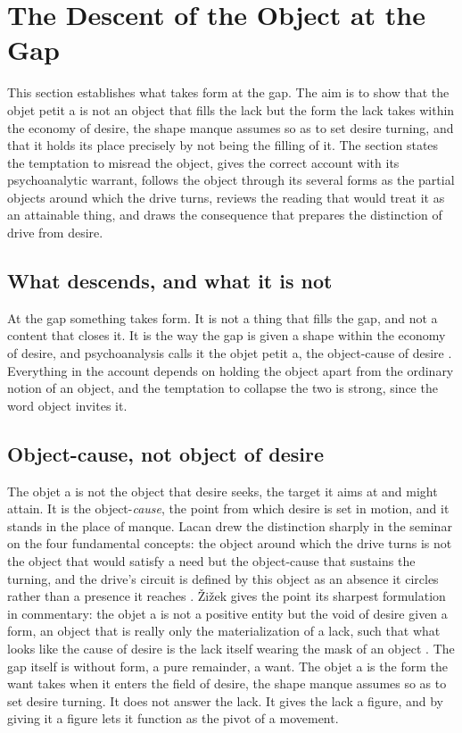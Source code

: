 \section{The Descent of the Object at the Gap}
\label{p26:sec:descent}

\noindent
This section establishes what takes form at the gap. The aim is to show that the objet petit a is not an object that fills the lack but the form the lack takes within the economy of desire, the shape manque assumes so as to set desire turning, and that it holds its place precisely by not being the filling of it. The section states the temptation to misread the object, gives the correct account with its psychoanalytic warrant, follows the object through its several forms as the partial objects around which the drive turns, reviews the reading that would treat it as an attainable thing, and draws the consequence that prepares the distinction of drive from desire.

\subsection*{What descends, and what it is not}

At the gap something takes form. It is not a thing that fills the gap, and not a content that closes it. It is the way the gap is given a shape within the economy of desire, and psychoanalysis calls it the objet petit a, the object-cause of desire \parencite{lacan1977xi}. Everything in the account depends on holding the object apart from the ordinary notion of an object, and the temptation to collapse the two is strong, since the word object invites it.

\subsection*{Object-cause, not object of desire}

The objet a is not the object that desire seeks, the target it aims at and might attain. It is the object-\emph{cause}, the point from which desire is set in motion, and it stands in the place of manque. Lacan drew the distinction sharply in the seminar on the four fundamental concepts: the object around which the drive turns is not the object that would satisfy a need but the object-cause that sustains the turning, and the drive's circuit is defined by this object as an absence it circles rather than a presence it reaches \parencite{lacan1977xi}. Žižek gives the point its sharpest formulation in commentary: the objet a is not a positive entity but the void of desire given a form, an object that is really only the materialization of a lack, such that what looks like the cause of desire is the lack itself wearing the mask of an object \parencite{zizek1989sublime}. The gap itself is without form, a pure remainder, a want. The objet a is the form the want takes when it enters the field of desire, the shape manque assumes so as to set desire turning. It does not answer the lack. It gives the lack a figure, and by giving it a figure lets it function as the pivot of a movement.

